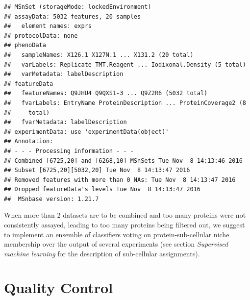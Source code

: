 \begin{knitrout}
\color{fgcolor}\begin{kframe}
\begin{alltt}
 \hlkwb{<-} 
\end{alltt}
\begin{verbatim}
## MSnSet (storageMode: lockedEnvironment)
## assayData: 5032 features, 20 samples 
##   element names: exprs 
## protocolData: none
## phenoData
##   sampleNames: X126.1 X127N.1 ... X131.2 (20 total)
##   varLabels: Replicate TMT.Reagent ... Iodixonal.Density (5 total)
##   varMetadata: labelDescription
## featureData
##   featureNames: Q9JHU4 Q9QXS1-3 ... Q9Z2R6 (5032 total)
##   fvarLabels: EntryName ProteinDescription ... ProteinCoverage2 (8
##     total)
##   fvarMetadata: labelDescription
## experimentData: use 'experimentData(object)'
## Annotation:  
## - - - Processing information - - -
## Combined [6725,20] and [6268,10] MSnSets Tue Nov  8 14:13:46 2016 
## Subset [6725,20][5032,20] Tue Nov  8 14:13:47 2016 
## Removed features with more than 0 NAs: Tue Nov  8 14:13:47 2016 
## Dropped featureData's levels Tue Nov  8 14:13:47 2016 
##  MSnbase version: 1.21.7
\end{verbatim}
\end{kframe}
\end{knitrout}

When more than 2 datasets are to be combined and too many proteins were
not consistently assayed, leading to too many proteins being filtered
out, we suggest to implement an ensemble of classifiers voting on
protein-sub-cellular niche membership over the output of several
experiments (see section \textit{Supervised machine learning} for the
description of sub-cellular assignments).

\section*{Quality Control}

